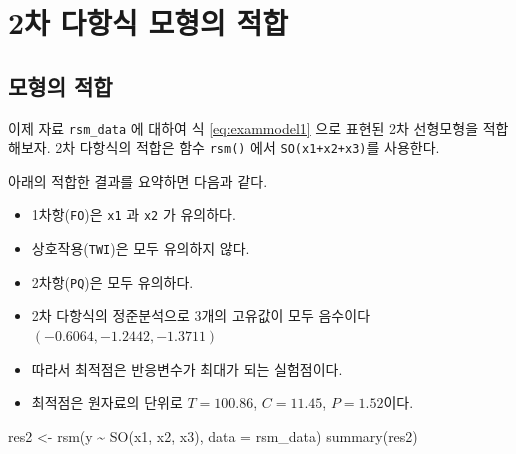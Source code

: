 \documentclass[
]{book}
\newenvironment{Shaded}{\begin{snugshade}}{\end{snugshade}}
\newcommand{\AttributeTok}[1]{\textcolor[rgb]{0.77,0.63,0.00}{#1}}
\newcommand{\FunctionTok}[1]{\textcolor[rgb]{0.00,0.00,0.00}{#1}}
\newcommand{\NormalTok}[1]{#1}
\newcommand{\OtherTok}[1]{\textcolor[rgb]{0.56,0.35,0.01}{#1}}
\newcommand{\SpecialCharTok}[1]{\textcolor[rgb]{0.00,0.00,0.00}{#1}}
\providecommand{\tightlist}{%
  \setlength{\itemsep}{0pt}\setlength{\parskip}{0pt}}
\theoremstyle{definition}
\theoremstyle{definition}
\theoremstyle{definition}
\theoremstyle{definition}
\theoremstyle{remark}
\begin{document}
\hypertarget{uxcc28-uxb2e4uxd56duxc2dd-uxbaa8uxd615uxc758-uxc801uxd569}{%
\section{2차 다항식 모형의 적합}\label{uxcc28-uxb2e4uxd56duxc2dd-uxbaa8uxd615uxc758-uxc801uxd569}}

\hypertarget{uxbaa8uxd615uxc758-uxc801uxd569}{%
\subsection{모형의 적합}\label{uxbaa8uxd615uxc758-uxc801uxd569}}

이제 자료 \texttt{rsm\_data} 에 대하여 식 \eqref{eq:exammodel1} 으로 표현된 2차 선형모형을 적합해보자.
2차 다항식의 적합은 함수 \texttt{rsm()} 에서 \texttt{SO(x1+x2+x3)}를 사용한다.

아래의 적합한 결과를 요약하면 다음과 같다.

\begin{itemize}
\tightlist
\item
  1차항(\texttt{FO})은 \texttt{x1} 과 \texttt{x2} 가 유의하다.
\item
  상호작용(\texttt{TWI})은 모두 유의하지 않다.
\item
  2차항(\texttt{PQ})은 모두 유의하다.
\item
  2차 다항식의 정준분석으로 3개의 고유값이 모두 음수이다 \((-0.6064, -1.2442, -1.3711)\)
\item
  따라서 최적점은 반응변수가 최대가 되는 실험점이다.
\item
  최적점은 원자료의 단위로 \(T=100.86\), \(C=11.45\), \(P=1.52\)이다.
\end{itemize}

\begin{Shaded}
\begin{Highlighting}[]
\NormalTok{res2 }\OtherTok{\textless{}{-}} \FunctionTok{rsm}\NormalTok{(y }\SpecialCharTok{\textasciitilde{}} \FunctionTok{SO}\NormalTok{(x1, x2, x3), }\AttributeTok{data =}\NormalTok{ rsm\_data)}
\FunctionTok{summary}\NormalTok{(res2)}
\end{Highlighting}
\end{Shaded}
\end{document}
